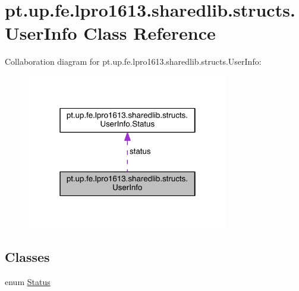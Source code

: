 \hypertarget{classpt_1_1up_1_1fe_1_1lpro1613_1_1sharedlib_1_1structs_1_1_user_info}{}\section{pt.\+up.\+fe.\+lpro1613.\+sharedlib.\+structs.\+User\+Info Class Reference}
\label{classpt_1_1up_1_1fe_1_1lpro1613_1_1sharedlib_1_1structs_1_1_user_info}


Collaboration diagram for pt.\+up.\+fe.\+lpro1613.\+sharedlib.\+structs.\+User\+Info\+:
\nopagebreak
\begin{figure}[H]
\begin{center}
\leavevmode
\includegraphics[width=250pt]{classpt_1_1up_1_1fe_1_1lpro1613_1_1sharedlib_1_1structs_1_1_user_info__coll__graph}
\end{center}
\end{figure}
\subsection*{Classes}
\begin{DoxyCompactItemize}
\item 
enum \hyperlink{enumpt_1_1up_1_1fe_1_1lpro1613_1_1sharedlib_1_1structs_1_1_user_info_1_1_status}{Status}
\end{DoxyCompactItemize}
